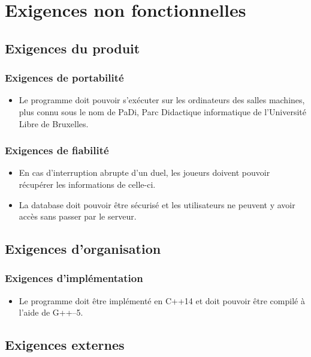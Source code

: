 \section{Exigences non fonctionnelles}
    \subsection{Exigences du produit}
        \subsubsection{Exigences de portabilité}
            \begin{itemize}
            \renewcommand\labelitemi{\textbullet}
                \item Le programme doit pouvoir s'exécuter sur les ordinateurs des salles machines, plus connu sous le nom de PaDi, Parc Didactique informatique de l'Université Libre de Bruxelles.
            \end{itemize}
        \subsubsection{Exigences de fiabilité}
            \begin{itemize}
            \renewcommand\labelitemi{\textbullet}
                \item En cas d'interruption abrupte d'un duel, les joueurs doivent pouvoir récupérer les informations de celle-ci.
                \item La database doit pouvoir être sécurisé et les utilisateurs ne peuvent y avoir accès sans passer par le serveur.
            \end{itemize}
    \subsection{Exigences d'organisation}
        \subsubsection{Exigences d'implémentation}
            \begin{itemize}
            \renewcommand\labelitemi{\textbullet}
            \item Le programme doit être implémenté en C++14 et doit pouvoir être compilé à l'aide de G++--5.
        \end{itemize}
    \subsection{Exigences externes}
